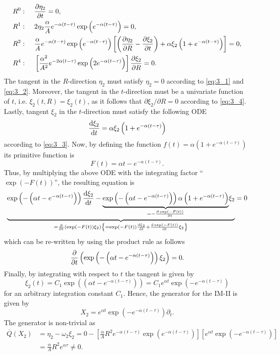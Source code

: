 \begin{align}
  R^{0}:&\;\;\;\;\;\pdv{\eta_2}{t}=0,\label{eq:3_1}\\
  R^{1}:&\;\;\;\;\;2\eta_2\dfrac{\alpha}{A}e^{-\alpha(t-\tau)}\exp\left(e^{-\alpha(t-\tau)}\right)=0,\label{eq:3_2}\\ R^{2}:&\;\;\;\;\;\dfrac{\alpha}{A}e^{-\alpha(t-\tau)}\exp\left(e^{-\alpha(t-\tau)}\right)\left[\left(\pdv{\eta_2}{R}-\pdv{\xi_2}{t}\right)+\alpha\xi_2\left(1+e^{-\alpha(t-\tau)}\right)\right]=0,\label{eq:3_3}\\
R^{4}:&\;\;\;\;\; \left[\dfrac{\alpha^2}{A^2}e^{-2\alpha(t-\tau)}\exp\left(2e^{-\alpha(t-\tau)}\right)\right]\pdv{\xi_2}{R}=0.\label{eq:3_4} 
\end{align}
The tangent in the $R$-direction $\eta_2$ must satisfy $\eta_2=0$ according to \eqref{eq:3_1} and \eqref{eq:3_2}. Moreover, the tangent in the $t$-direction must be a univariate function of $t$, i.e. $\xi_2(t,R)=\xi_2(t)$, as it follows that $\partial\xi_2/\partial R=0$ according to \eqref{eq:3_4}. Lastly, tangent $\xi_2$ in the $t$-direction must satisfy the following ODE
$$\dv{\xi_2}{t}=\alpha\xi_2\left(1+e^{-\alpha(t-\tau)}\right)$$
according to \eqref{eq:3_3}. Now, by defining the function $f(t)=\alpha\left(1+e^{-\alpha(t-\tau)}\right)$ its primitive function is
$$F(t)=\alpha t-e^{-\alpha(t-\tau)}.$$
Thus, by multiplying the above ODE with the integrating factor ``$\exp\left(-F(t)\right)$'', the resulting equation is
$$\underset{=\pdv{}{t}\left(\exp\left(-F(t)\right)\xi_2\right)\left\{=\exp\left(-F(t)\right)\dv{\xi_2}{t}+\dv{\exp\left(-F(t)\right)}{t}\xi_2\right\}}{\underbrace{\exp\left(-\left(\alpha t-e^{-\alpha(t-\tau)}\right)\right)\dv{\xi_2}{t}-\underset{=-\pdv{\exp\left(-F(t)\right)}{t}}{\underbrace{\exp\left(-\left(\alpha t-e^{-\alpha(t-\tau)}\right)\right)\alpha\left(1+e^{-\alpha(t-\tau)}\right)}}\xi_2}}=0$$
which can be re-written by using the product rule as follows
$$\pdv{}{t}\left(\exp\left(-\left(\alpha t-e^{-\alpha(t-\tau)}\right)\right)\xi_2\right)=0.$$
Finally, by integrating with respect to $t$ the tangent is given by
$$\xi_2(t)=C_1\exp\left(\left(\alpha t-e^{-\alpha(t-\tau)}\right)\right)=C_1e^{\alpha t}\exp\left(-e^{-\alpha(t-\tau)}\right)$$
for an arbitrary integration constant $C_1$. Hence, the generator for the IM-II is given by
$$X_2=e^{\alpha t}\exp\left(-e^{-\alpha(t-\tau)}\right)\partial_t.$$
The generator is non-trivial as
\begin{align*}
  \overline{Q}(X_2)&=\eta_2-\omega_2\xi_2=0-\left[\frac{\alpha}{A}R^2e^{-\alpha(t-\tau)}\exp\left(e^{-\alpha(t-\tau)}\right)\right]\left[e^{\alpha t}\exp\left(-e^{-\alpha(t-\tau)}\right)\right]\\
  &=\frac{\alpha}{A}R^2e^{\alpha\tau}\neq 0.
\end{align*}

